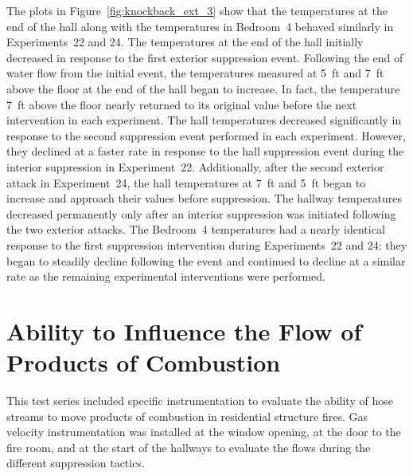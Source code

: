 \documentclass[12pt,oneside]{book}
\begin{document}
\FloatBarrier 

The plots in Figure~\ref{fig:knockback_ext_3} show that the temperatures at the end of the hall along with the temperatures in Bedroom~4 behaved similarly in Experiments~22 and 24. The temperatures at the end of the hall initially decreased in response to the first exterior suppression event. Following the end of water flow from the initial event, the temperatures measured at 5~ft and 7~ft above the floor at the end of the hall began to increase. In fact, the temperature 7~ft above the floor nearly returned to its original value before the next intervention in each experiment. The hall temperatures decreased significantly in response to the second suppression event performed in each experiment. However, they declined at a faster rate in response to the hall suppression event during the interior suppression in Experiment~22. Additionally, after the second exterior attack in Experiment~24, the hall temperatures at 7~ft and 5~ft began to increase and approach their values before suppression. The hallway temperatures decreased permanently only after an interior suppression was initiated following the two exterior attacks. The Bedroom~4 temperatures had a nearly identical response to the first suppression intervention during Experiments~22 and 24: they began to steadily decline following the event and continued to decline at a similar rate as the remaining experimental interventions were performed. 

\FloatBarrier

\section{Ability to Influence the Flow of Products of Combustion}
This test series included specific instrumentation to evaluate the ability of hose streams to move products of combustion in residential structure fires. Gas velocity instrumentation was installed at the window opening, at the door to the fire room, and at the start of the hallways to evaluate the flows during the different suppression tactics.
\end{document}
